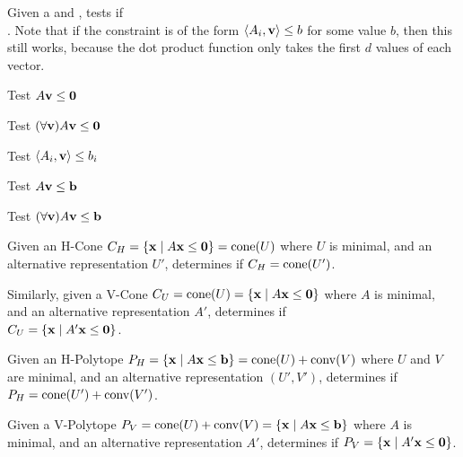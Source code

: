 Given a  and , tests if \\
.  Note that if the constraint is of the form $\left\langle A_i, \mathbf{v} \right\rangle \leq b$ for some value $b$, then this still works, because the dot product function only takes the first $d$ values of each vector.
\lstraysatisfieda

Test $A\mathbf{v} \leq \mathbf{0}$
\lstraysatisfiedb


Test $(\forall \mathbf{v}) A\mathbf{v} \leq \mathbf{0}$
\lstrayssatisfied

Test $\left\langle A_i, \mathbf{v} \right\rangle \leq b_i$
\lstvecsatisfieda

Test $A\mathbf{v} \leq \mathbf{b}$
\lstvecsatisfiedb

Test $(\forall \mathbf{v}) A\mathbf{v} \leq \mathbf{b}$
\lstvecssatisfied

Given an H-Cone $C_H = \left\{\mathbf{x}\;|\; A\mathbf{x}\leq\mathbf{0}\right\} = \operatorname{cone}(U)$ where $U$ is minimal, and an alternative representation $U'$, determines if $C_H = \operatorname{cone}(U')$.

Similarly, given a V-Cone $C_U = \operatorname{cone}(U) = \left\{\mathbf{x}\;|\; A\mathbf{x}\leq\mathbf{0}\right\}$ where $A$ is minimal, and an alternative representation $A'$, determines if \\
$C_U = \left\{\mathbf{x}\;|\; A'\mathbf{x}\leq\mathbf{0}\right\}$.
\lstequivalentconerep

Given an H-Polytope $P_H = \left\{\mathbf{x}\;|\; A\mathbf{x}\leq\mathbf{b}\right\} = \operatorname{cone}(U) + \operatorname{conv}(V)$ where $U$ and $V$ are minimal, and an alternative representation $(U',V')$, determines if $P_H = \operatorname{cone}(U') + \operatorname{conv}(V')$.
\lstequivalenthpolyrep

Given a V-Polytope $P_V = \operatorname{cone}(U) + \operatorname{conv}(V) = \left\{\mathbf{x}\;|\; A\mathbf{x}\leq\mathbf{b}\right\}$ where $A$ is minimal, and an alternative representation $A'$, determines if $P_V = \left\{\mathbf{x}\;|\; A'\mathbf{x}\leq\mathbf{0}\right\}$.
\lstequivalentvpolyrep



